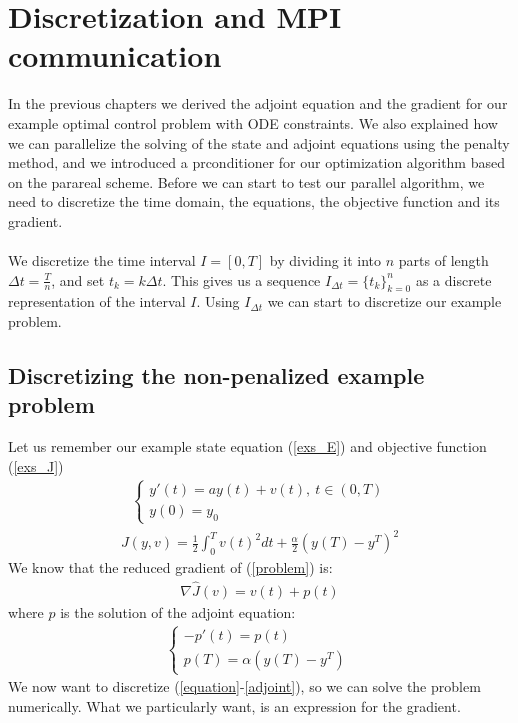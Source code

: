 \chapter{Discretization and MPI communication}
In the previous chapters we derived the adjoint equation and the gradient for our example optimal control problem with ODE constraints. We also explained how we can parallelize the solving of the state and adjoint equations using the penalty method, and we introduced a prconditioner for our optimization algorithm based on the parareal scheme. Before we can start to test our parallel algorithm, we need to discretize the time domain, the equations, the objective function and its gradient. 
\\
\\
We discretize the time interval $I=[0,T]$ by dividing it into $n$ parts of length $\Delta t=\frac{T}{n}$, and set $t_k=k\Delta t$. This gives us a sequence $I_{\Delta t}=\{t_k\}_{k=0}^{n}$ as a discrete representation of the interval $I$. Using $I_{\Delta t}$ we can start to discretize our example problem.
\section{Discretizing the non-penalized example problem}
Let us remember our example state equation (\ref{exs_E}) and objective function (\ref{exs_J}) 
\begin{align}
\left\{
     \begin{array}{lr}
       	y'(t)=a y(t) +v(t), \ t \in (0,T)\\
       	   y(0)=y_0
     \end{array}
   \right. \label{equation}
\end{align}
\begin{align}
J(y,v) = \frac{1}{2}\int_0^Tv(t)^2dt + \frac{\alpha}{2}(y(T)-y^T)^2
\label{problem}
\end{align}
We know that the reduced gradient of (\ref{problem}) is:
\begin{align}
\nabla\hat{J}(v) = v(t)+p(t) \label{gradiant}
\end{align}
where $p$ is the solution of the adjoint equation:
\begin{align}   
  \left\{
     \begin{array}{lr}
	-p'(t) = p(t) \\
	p(T) = \alpha( y(T)-y^T)     \
	\end{array}
   \right. \label{adjoint}
\end{align}
We now want to discretize (\ref{equation}-\ref{adjoint}), so we can solve the problem numerically. What we particularly want, is an expression for the gradient. 

